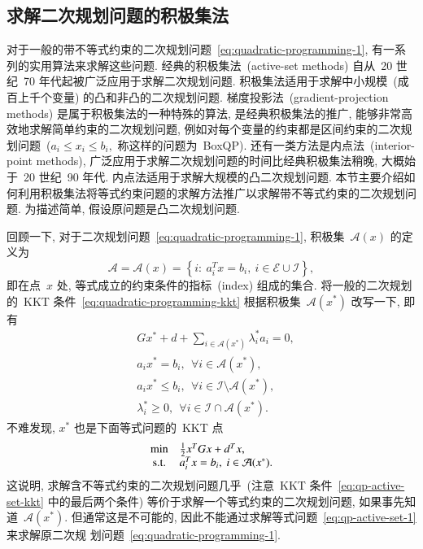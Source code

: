 \subsection{求解二次规划问题的积极集法}
\label{subsec:7.2.2}

对于一般的带不等式约束的二次规划问题~\eqref{eq:quadratic-programming-1}, 有一系列的实用算法来求解这些问题. 经典的积极集法~(active-set methods) 自从~20 世纪~70 年代起被广泛应用于求解二次规划问题. 积极集法适用于求解中小规模~(成百上千个变量) 的凸和非凸的二次规划问题. 梯度投影法~(gradient-projection methods) 是属于积极集法的一种特殊的算法, 是经典积极集法的推广, 能够非常高效地求解简单约束的二次规划问题, 例如对每个变量的约束都是区间约束的二次规划问题~($a_i \leqslant x_i \leqslant b_i,$ 称这样的问题为~BoxQP). 还有一类方法是内点法~(interior-point methods), 广泛应用于求解二次规划问题的时间比经典积极集法稍晚, 大概始于~20 世纪~90 年代. 内点法适用于求解大规模的凸二次规划问题. 本节主要介绍如何利用积极集法将等式约束问题的求解方法推广以求解带不等式约束的二次规划问题. 为描述简单, 假设原问题是凸二次规划问题.

回顾一下, 对于二次规划问题~\eqref{eq:quadratic-programming-1}, 积极集~$\mathcal{A}(x)$ 的定义为
\begin{equation}
\label{eq:qp-active-set}
\mathcal{A} = \mathcal{A}({x}) = \left\{ i : ~ {a}_i^T {x} = b_i, ~ i \in \mathcal{E} \cup \mathcal{I} \right\},
\end{equation}
即在点~${x}$ 处, 等式成立的约束条件的指标~(index) 组成的集合.
将一般的二次规划的~KKT 条件~\eqref{eq:quadratic-programming-kkt} 根据积极集~$\mathcal{A}({x}^*)$ 改写一下, 即有
\begin{equation}
\label{eq:qp-active-set-kkt}
\begin{aligned}
& G {x}^* + d + \sum\limits_{i \in \mathcal{A}({x}^*)} \lambda_i^* {a}_i = {0}, \\
& {a}_i {x}^* = b_i, ~~ \forall i \in \mathcal{A}({x}^*), \\
& {a}_i {x}^* \leqslant b_i, ~~ \forall i \in \mathcal{I} \setminus \mathcal{A}({x}^*), \\
& \lambda_i^* \geqslant 0, ~~ \forall i \in \mathcal{I} \cap \mathcal{A}({x}^*).
\end{aligned}
\end{equation}
不难发现, ${x}^*$ 也是下面等式问题的~KKT 点
\begin{equation}
\label{eq:qp-active-set-1}
\begin{array}{cl}
\min & \frac{1}{2} {x}^T G {x} + {d}^T {x}, \\
{\rm s.t.} & {a}_i^T {x} = b_i, ~ i \in \mathcal{A}({x}^*).
\end{array}
\end{equation}
这说明, 求解含不等式约束的二次规划问题几乎~(注意~KKT 条件~\eqref{eq:qp-active-set-kkt} 中的最后两个条件) 等价于求解一个等式约束的二次规划问题, 如果事先知道~$\mathcal{A}({x}^*).$ 但通常这是不可能的, 因此不能通过求解等式问题~\eqref{eq:qp-active-set-1} 来求解原二次规
划问题~\eqref{eq:quadratic-programming-1}.

